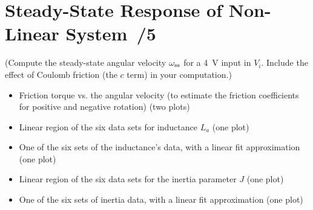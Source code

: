 \documentclass{article}
\newcommand{\score}{\hfill \underline{\hspace{0.65cm}}\,/} %
\begin{document}
\section{Steady-State Response of Non-Linear System \score 5}
(Compute the steady-state angular velocity $\omega_{\rm ss}$ for a \SI{4}{\volt} input in $V_i$. Include the effect of Coulomb friction (the $c$ term) in your computation.)
\newline \\[3mm]
\begin{itemize}
\item Friction torque vs. the angular velocity (to estimate the friction coefficients for positive and negative rotation) (two plots)
\item Linear region of the six data sets for inductance $L_a$ (one plot)
\item One of the six sets of the inductance's data, with a linear fit approximation (one plot)
\item Linear region of the six data sets for the inertia parameter $J$ (one plot)
\item One of the six sets of inertia data, with a linear fit approximation (one plot)
\end{itemize}
\end{document}
